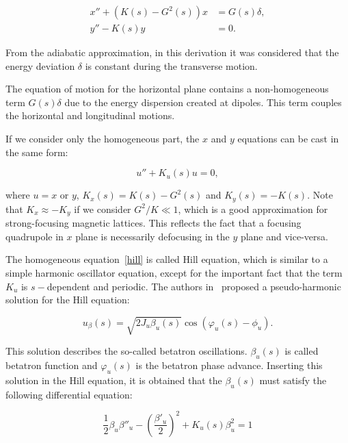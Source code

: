 \begin{align}
    x'' + \left(K(s) - G^{2}(s)\right)x &= G(s) \delta, \\
    y'' - K(s)y &= 0.
\end{align}

From the adiabatic approximation, in this derivation it was considered that the energy deviation $\delta$ is constant during the transverse motion.

The equation of motion for the horizontal plane contains a non-homogeneous term $G(s)\delta$ due to the energy dispersion created at dipoles. This term couples the horizontal and longitudinal motions.

If we consider only the homogeneous part, the $x$ and $y$ equations can be cast in the same form:

\begin{equation}
u'' + K_u(s) u = 0,
\label{hill}
\end{equation}

where $u = x$ or $y$, $K_x(s) = K(s) - G^2(s)$ and $K_y(s) = -K(s)$. Note that $K_x \approx -K_y$ if we consider $G^2/K \ll 1$, which is a good approximation for strong-focusing magnetic lattices. This reflects the fact that a focusing quadrupole in $x$ plane is necessarily defocusing in the $y$ plane and vice-versa. 

The homogeneous equation~\eqref{hill} is called Hill equation, which is similar to a simple harmonic oscillator equation, except for the important fact that the term $K_u$ is $s-$dependent and periodic. The authors in~\cite{CourantSnyder1958} proposed a pseudo-harmonic solution for the Hill equation:

\begin{equation}
    u_{\beta}(s) = \sqrt{2 J_u \beta_u (s)} \cos \left(\varphi_u(s) - \phi_u\right).
    \label{eq:beta_oscillation}
\end{equation}

This solution describes the so-called betatron oscillations. $\beta_u(s)$ is called betatron function and $\varphi_u(s)$ is the betatron phase advance. Inserting this solution in the Hill equation, it is obtained that the $\beta_u(s)$ must satisfy the following differential equation:

\begin{equation}
    \dfrac{1}{2}\beta_u {\beta''_u} -  \left(\dfrac{\beta'_u}{2}\right)^2 + K_u(s) \beta^2_u = 1
    \label{beta_equation}
\end{equation}

